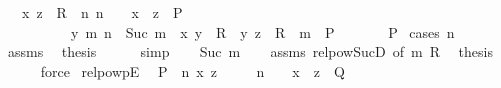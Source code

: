 \begin{isabellebody}
\ \ \ {\isachardoublequoteopen}{\isacharparenleft}{\kern0pt}x{\isacharcomma}{\kern0pt}\ z{\isacharparenright}{\kern0pt}\ {\isasymin}\ R\ {\isacharcircum}{\kern0pt}{\isacharcircum}{\kern0pt}\ n{\isachardoublequoteclose}\ {\isachardoublequoteopen}n\ {\isacharequal}{\kern0pt}\ {}\ {\isasymLongrightarrow}\ x\ {\isacharequal}{\kern0pt}\ z\ {\isasymLongrightarrow}\ P{\isachardoublequoteclose}\isanewline
\ \ \ \ \ \ \ \ \ \ {\isachardoublequoteopen}{\isasymAnd}y\ m{\isachardot}{\kern0pt}\ n\ {\isacharequal}{\kern0pt}\ Suc\ m\ {\isasymLongrightarrow}\ {\isacharparenleft}{\kern0pt}x{\isacharcomma}{\kern0pt}\ y{\isacharparenright}{\kern0pt}\ {\isasymin}\ R\ {\isasymLongrightarrow}\ {\isacharparenleft}{\kern0pt}y{\isacharcomma}{\kern0pt}\ z{\isacharparenright}{\kern0pt}\ {\isasymin}\ R\ {\isacharcircum}{\kern0pt}{\isacharcircum}{\kern0pt}\ m\ {\isasymLongrightarrow}\ P{\isachardoublequoteclose}\isanewline
\ \ \ \ \ \ \ {\isachardoublequoteopen}P{\isachardoublequoteclose}\isanewline
%
\isadelimproof
%
\endisadelimproof
%
\isatagproof
{}\isamarkupfalse%
\ {\isacharparenleft}{\kern0pt}cases\ n{\isacharparenright}{\kern0pt}\isanewline
\ \ \isamarkupfalse%
\ {}\isanewline
\ \ \isamarkupfalse%
\ assms\ \isamarkupfalse%
\ {\isacharquery}{\kern0pt}thesis\isanewline
\ \ \ \ \isamarkupfalse%
\ simp\isanewline
{}\isamarkupfalse%
\isanewline
\ \ \isamarkupfalse%
\ {\isacharparenleft}{\kern0pt}Suc\ m{\isacharparenright}{\kern0pt}\isanewline
\ \ \isamarkupfalse%
\ assms\ relpow{\isacharunderscore}{\kern0pt}Suc{\isacharunderscore}{\kern0pt}D{}{\isacharprime}{\kern0pt}\ {\isacharbrackleft}{\kern0pt}of\ m\ R{\isacharbrackright}{\kern0pt}\ \isamarkupfalse%
\ {\isacharquery}{\kern0pt}thesis\isanewline
\ \ \ \ \isamarkupfalse%
\ force\isanewline
{}\isamarkupfalse%
%
\endisatagproof
{\isafoldproof}%
%
\isadelimproof
\isanewline
%
\endisadelimproof
\isanewline
{}\isamarkupfalse%
\ relpowp{\isacharunderscore}{\kern0pt}E{}{\isacharcolon}{\kern0pt}\isanewline
\ \ {\isachardoublequoteopen}{\isacharparenleft}{\kern0pt}P\ {\isacharcircum}{\kern0pt}{\isacharcircum}{\kern0pt}\ n{\isacharparenright}{\kern0pt}\ x\ z\ {\isasymLongrightarrow}\isanewline
\ \ \ \ {\isacharparenleft}{\kern0pt}n\ {\isacharequal}{\kern0pt}\ {}\ {\isasymLongrightarrow}\ x\ {\isacharequal}{\kern0pt}\ z\ {\isasymLongrightarrow}\ Q{\isacharparenright}{\kern0pt}\ {\isasymLongrightarrow}\isanewline

\end{isabellebody}
